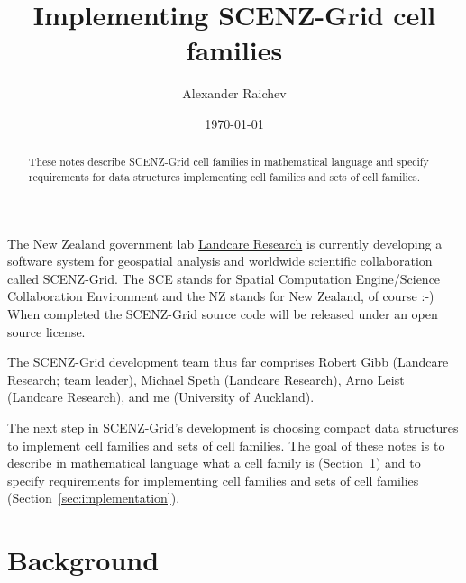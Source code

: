 \documentclass[12pt,a4paper]{amsart}
\numberwithin{figure}{section}
\begin{document}
\title{Implementing SCENZ-Grid cell families}
\author{Alexander Raichev}
\address{University of Auckland \\ Department of Computer Science \\
  Private Bag 92019 \\ Auckland \\ New Zealand}
\begin{abstract}
These notes describe SCENZ-Grid cell families in mathematical language and specify requirements for data structures implementing cell families and sets of cell families.
\end{abstract}
\date{\today}
\maketitle

The New Zealand government lab \href{http://en.wikipedia.org/wiki/Landcare_Research}{Landcare Research}
is currently developing a software system for geospatial analysis and worldwide scientific collaboration called SCENZ-Grid. 
The SCE stands for Spatial Computation Engine/Science Collaboration Environment and the NZ stands for New Zealand, of course :-)
When completed the SCENZ-Grid source code will be released under an open source license. 

The SCENZ-Grid development team thus far comprises Robert Gibb (Landcare Research; team leader), Michael Speth (Landcare Research), Arno Leist (Landcare Research), and me (University of Auckland).

The next step in SCENZ-Grid's development is choosing compact data structures to implement cell families and sets of cell families.
The goal of these notes is to describe in mathematical language what a cell family is (Section~\ref{sec:background}) and to specify requirements for implementing cell families and sets of cell families (Section~\ref{sec:implementation}).

\section{Background}\label{sec:background}

\end{document}
